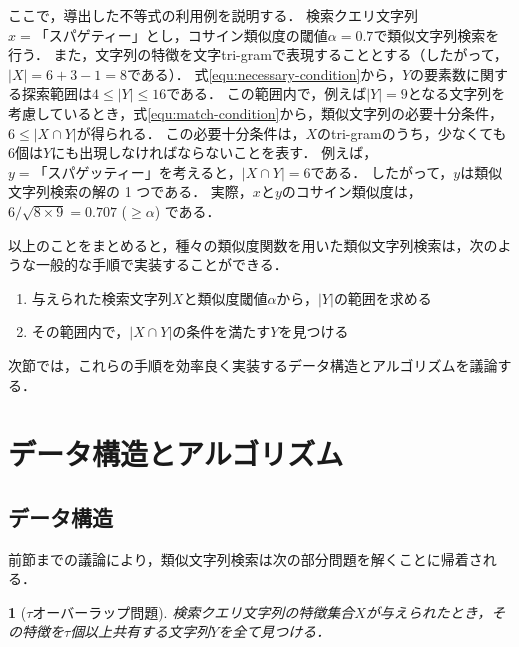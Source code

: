 \documentclass[japanese]{jnlp_JS2.0}
\newtheorem{definition}{}
\begin{document}
ここで，導出した不等式の利用例を説明する．
検索クエリ文字列$x = \mbox{「スパゲティー」}$とし，コサイン類似度の閾値$\alpha = 0.7$で類似文字列検索を行う．
また，文字列の特徴を文字tri-gramで表現することとする（したがって，$|X| = 6 + 3 - 1 = 8$である）．
式\ref{equ:necessary-condition}から，$Y$の要素数に関する探索範囲は$4 \leq |Y| \leq 16$である．
この範囲内で，例えば$|Y| = 9$となる文字列を考慮しているとき，式\ref{equ:match-condition}から，類似文字列の必要十分条件，$6 \leq |X \cap Y|$が得られる．
この必要十分条件は，$X$のtri-gramのうち，少なくても6個は$Y$にも出現しなければならないことを表す．
例えば，$y = \mbox{「スパゲッティー」}$を考えると，$|X \cap Y| = 6$である．
したがって，$y$は類似文字列検索の解の 1 つである．
実際，$x$と$y$のコサイン類似度は，$6 / \sqrt{8 \times 9} = 0.707$ ($\geq \alpha$) である．

以上のことをまとめると，種々の類似度関数を用いた類似文字列検索は，次のような一般的な手順で実装することができる．
\begin{enumerate}
    \item 与えられた検索文字列$X$と類似度閾値$\alpha$から，$|Y|$の範囲を求める
    \item その範囲内で，$|X \cap Y|$の条件を満たす$Y$を見つける
\end{enumerate}
次節では，これらの手順を効率良く実装するデータ構造とアルゴリズムを議論する．



\section{データ構造とアルゴリズム}
\label{sec:method}

\subsection{データ構造}
\label{sec:data-structure}

前節までの議論により，類似文字列検索は次の部分問題を解くことに帰着される．

\begin{definition}[$\tau$オーバーラップ問題]
検索クエリ文字列の特徴集合$X$が与えられたとき，その特徴を$\tau$個以上共有する文字列$Y$を全て見つける．
\end{definition}
\end{document}
